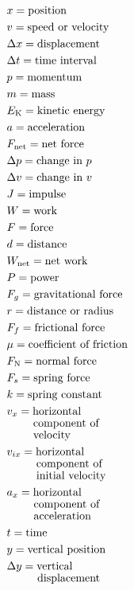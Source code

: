 \documentclass[dvipsnames]{article}
\begin{document}
\begin{multicols*}{4}
\begin{align*}
    & x = \text{position} \\
    & v = \text{speed or velocity} \\
    & \Delta x = \text{displacement} \\
    & \Delta t = \text{time interval} \\
    & p = \text{momentum} \\
    & m = \text{mass} \\
    & E_\mathrm{K} = \text{kinetic energy}\\
    & a = \text{acceleration} \\
    & F_\mathrm{net} = \text{net force} \\
    & \Delta p = \text{change in } p \\
    & \Delta v = \text{change in } v \\
    & J = \text{impulse} \\
    & W = \text{work} \\
    & F = \text{force} \\
    & d = \text{distance} \\
    & W_\mathrm{net} = \text{net work} \\
    & P = \text{power} \\
    & F_g = \text{gravitational force} \\
    & r = \text{distance or radius} \\
    & F_f = \text{frictional force} \\
    & \mu = \text{coefficient of friction} \\
    & F_\mathrm{N} = \text{normal force} \\
    & F_s = \text{spring force} \\
    & k = \text{spring constant} \\
    & v_x = \text{horizontal}\\[-1ex]
    & \textcolor{white}{v_x = } \text{ component of}\\[-1ex]
    & \textcolor{white}{v_x = } \text{ velocity}\\
    & v_{ix} = \text{horizontal}\\[-1ex]
    & \textcolor{white}{v_{ix} = } \text{ component of}\\[-1ex]
    & \textcolor{white}{v_{ix} = } \text{ initial velocity}\\
    & a_x = \text{horizontal}\\[-1ex]
    & \textcolor{white}{a_x = } \text{ component of} \\[-1ex]
    & \textcolor{white}{a_x = } \text{ acceleration} \\
    & t = \text{time} \\
    & y = \text{vertical position} \\
    & \Delta y = \text{vertical} \\[-1ex]
    & \textcolor{white}{\Delta y = } \text{ displacement} 
\end{align*}
\vspace*{\fill}


\end{multicols*}
\end{document}
